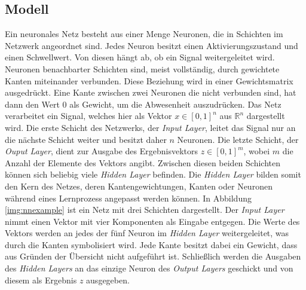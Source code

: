 \subsection{Modell}
Ein neuronales Netz besteht aus einer Menge Neuronen, die in Schichten im Netzwerk angeordnet sind. Jedes Neuron besitzt einen Aktivierungszustand und einen Schwellwert. Von diesen hängt ab, ob ein Signal weitergeleitet wird. Neuronen benachbarter Schichten sind, meist vollständig, durch gewichtete Kanten miteinander verbunden. Diese Beziehung wird in einer Gewichtsmatrix ausgedrückt. Eine Kante zwischen zwei Neuronen die nicht verbunden sind, hat dann den Wert 0 als Gewicht, um die Abwesenheit auszudrücken. 
Das Netz verarbeitet ein Signal, welches hier als Vektor $x \in [0,1]^n$ aus $\mathbb{R}^n$ dargestellt wird. Die erste Schicht des Netzwerks, der \textit{Input Layer}, leitet das Signal nur an die nächste Schicht weiter und besitzt daher $n$ Neuronen. Die letzte Schicht, der \textit{Ouput Layer}, dient zur Ausgabe des Ergebnisvektors $z \in [0,1]^m$, wobei $m$ die Anzahl der Elemente des Vektors angibt. Zwischen diesen beiden Schichten können sich beliebig viele \textit{Hidden Layer} befinden. Die \textit{Hidden Layer} bilden somit den Kern des Netzes, deren Kantengewichtungen, Kanten oder Neuronen während eines Lernprozess angepasst werden können. In Abbildung \ref{img:nnexample} ist ein Netz mit drei Schichten dargestellt. Der \textit{Input Layer} nimmt einen Vektor mit vier Komponenten als Eingabe entgegen. Die Werte des Vektors werden an jedes der fünf Neuron im \textit{Hidden Layer} weitergeleitet, was durch die Kanten symbolisiert wird. Jede Kante besitzt dabei ein Gewicht, dass aus Gründen der Übersicht nicht aufgeführt ist. Schließlich werden die Ausgaben des \textit{Hidden Layers} an das einzige Neuron des \textit{Output Layers} geschickt und von diesem als Ergebnis $z$ ausgegeben.

